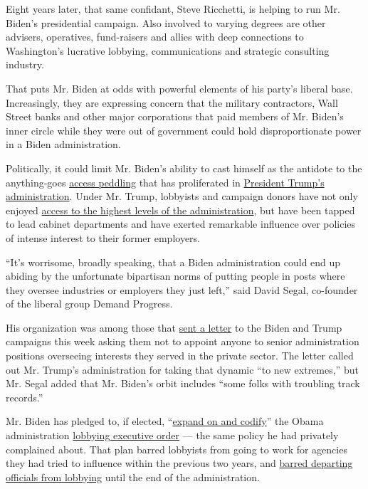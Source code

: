 Eight years later, that same confidant, Steve Ricchetti, is helping to
run Mr. Biden's presidential campaign. Also involved to varying degrees
are other advisers, operatives, fund-raisers and allies with deep
connections to Washington's lucrative lobbying, communications and
strategic consulting industry.

That puts Mr. Biden at odds with powerful elements of his party's
liberal base. Increasingly, they are expressing concern that the
military contractors, Wall Street banks and other major corporations
that paid members of Mr. Biden's inner circle while they were out of
government could hold disproportionate power in a Biden administration.

Politically, it could limit Mr. Biden's ability to cast himself as the
antidote to the anything-goes
\href{https://www.nytimes3xbfgragh.onion/2020/01/26/us/politics/trump-recording-donors.html}{access
peddling} that has proliferated in
\href{https://www.nytimes3xbfgragh.onion/2019/10/18/climate/trump-cabinet-lobbyists.html}{President
Trump's administration}. Under Mr. Trump, lobbyists and campaign donors
have not only enjoyed
\href{https://www.nytimes3xbfgragh.onion/2020/07/06/us/politics/trump-lobbyists-swamp-campaign.html}{access
to the highest levels of the administration}, but have been tapped to
lead cabinet departments and have exerted remarkable influence over
policies of intense interest to their former employers.

``It's worrisome, broadly speaking, that a Biden administration could
end up abiding by the unfortunate bipartisan norms of putting people in
posts where they oversee industries or employers they just left,'' said
David Segal, co-founder of the liberal group Demand Progress.

His organization was among those that
\href{https://therevolvingdoorproject.org/to-rebuild-public-trust-close-the-revolving-door/}{sent
a letter} to the Biden and Trump campaigns this week asking them not to
appoint anyone to senior administration positions overseeing interests
they served in the private sector. The letter called out Mr. Trump's
administration for taking that dynamic ``to new extremes,'' but Mr.
Segal added that Mr. Biden's orbit includes ``some folks with troubling
track records.''

Mr. Biden has pledged to, if elected,
``\href{https://joebiden.com/governmentreform/}{expand on and codify}''
the Obama administration
\href{https://www.oge.gov/web/oge.nsf/Executive\%20Orders/A70F962587DAC28F85257E96006A90F2/$FILE/23a5e4eeaffd4e14b4387b40b0eae5963.pdf?open}{lobbying
executive order} --- the same policy he had privately complained about.
That plan barred lobbyists from going to work for agencies they had
tried to influence within the previous two years, and
\href{https://www.nytimes3xbfgragh.onion/2009/01/22/us/politics/22obama.html}{barred
departing officials from lobbying} until the end of the administration.

